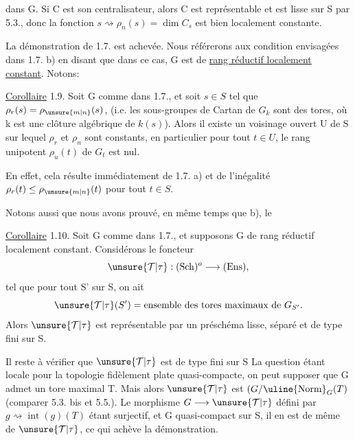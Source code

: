 dans G. Si C est son centralisateur, alors C est représentable et est
lisse sur S par  5.3., donc la fonction
$s\rightsquigarrow\rho_n(s)=\dim C_s$ est bien
localement constante.

La démonstration de 1.7. est achevée. Nous référerons aux
condition envisagées dans 1.7. b) en disant que dans ce cas, G est
de \uline{rang réductif localement constant}. Notons:

\uline{Corollaire} 1.9. Soit G comme dans 1.7., et soit $s\in S$ tel que
$\rho_r(s)=\rho_{\unsure{m|n}}(s)$, (i.e. les sous-groupes de Cartan de $G_k$ sont des tores, où k
est une clôture algébrique de $k(s)$). Alors il existe un voisinage 
ouvert U de S sur lequel $\rho_r$ et $\rho_n$ sont constants, en particulier pour
tout $t\in U$, le rang unipotent $\rho_u(t)$ de $G_t$ est nul.

En effet,  cela
résulte immédiatement de 1.7. a) et de l'inégalité $\rho_r(t)\le\rho_{\unsure{m|n}}(t)$ pour
tout $t\in S$.

Notons aussi que nous avons prouvé, en même temps que b), le

\uline{Corollaire} 1.10. Soit G comme dans 1.7., et supposons G de rang
réductif localement constant. Considérons le foncteur
\[
\unsure{\mathcal T|\tau}:(\mathrm{Sch})^o\longrightarrow(\mathrm{Ens}),
\]
tel que pour tout S' sur S, on ait
\[
\unsure{\mathcal T|\tau}(S')=\text{ensemble des tores maximaux de }G_{S'}.
\]
Alors $\unsure{\mathcal T|\tau}$ est représentable par un préschéma lisse, séparé et de
type fini sur S.

Il reste à vérifier que $\unsure{\mathcal T|\tau}$ est  de type fini sur S La
question étant locale pour la topologie fidèlement plate quasi-compacte,
on peut supposer que G admet un tore maximal T. Mais alors $\unsure{\mathcal T|\tau}$
 est
$(G/\uline{\operatorname{Norm}}_G(T)$ (comparer  5.3. bis et 5.5.).
 Le morphisme
$G\longrightarrow\unsure{\mathcal T|\tau}$ défini par $g\rightsquigarrow\operatorname{int}(g)(T)$ étant surjectif,
et G quasi-compact
sur S, il en est de même de $\unsure{\mathcal T|\tau}$, ce qui achève la démonstration.
